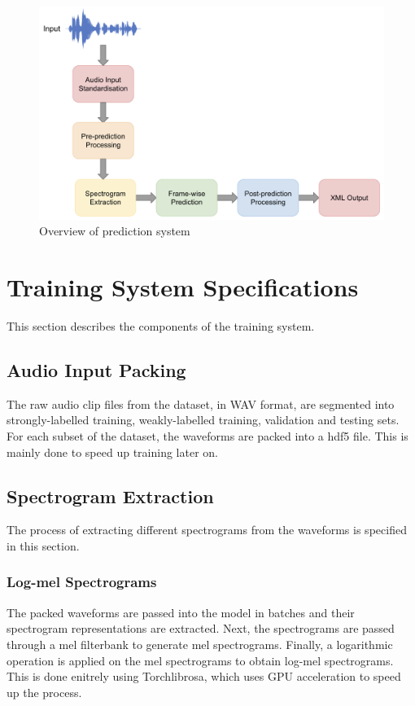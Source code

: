 \begin{figure}[!htb]
    \centering
    \includegraphics[width=\textwidth]{fig/prediction-system.png}
    \caption{Overview of prediction system}
    \label{fig:prediction-system}
\end{figure}

\section{Training System Specifications}
This section describes the components of the training system.

\subsection{Audio Input Packing}
The raw audio clip files from the dataset, in WAV format, are segmented into strongly-labelled training, weakly-labelled training, validation and testing sets. For each subset of the dataset, the waveforms are packed into a hdf5 file. This is mainly done to speed up training later on. 

\subsection{Spectrogram Extraction}
The process of extracting different spectrograms from the waveforms is specified in this section.

\subsubsection{Log-mel Spectrograms}
The packed waveforms are passed into the model in batches and their spectrogram representations are extracted. Next, the spectrograms are passed through a mel filterbank to generate mel spectrograms. Finally, a logarithmic operation is applied on the mel spectrograms to obtain log-mel spectrograms. This is done enitrely using Torchlibrosa, which uses GPU acceleration to speed up the process.

